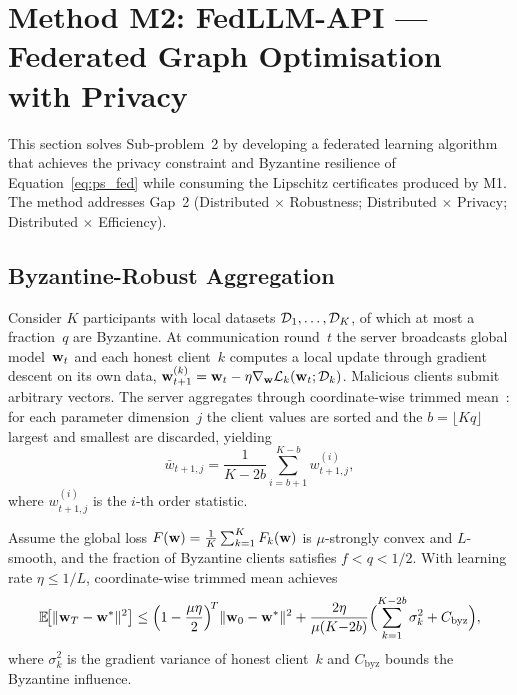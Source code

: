 \section{Method M2: FedLLM-API --- Federated Graph Optimisation with Privacy}
\label{sec:fedllm}

This section solves Sub-problem~2 by developing a federated learning algorithm that achieves the privacy constraint and Byzantine resilience of Equation~\eqref{eq:ps_fed} while consuming the Lipschitz certificates produced by M1. The method addresses Gap~2 (Distributed $\times$ Robustness; Distributed $\times$ Privacy; Distributed $\times$ Efficiency).

\subsection{Byzantine-Robust Aggregation}

Consider $K$ participants with local datasets $\mathcal{D}_1,\dots,\mathcal{D}_K$, of which at most a fraction~$q$ are Byzantine. At communication round~$t$ the server broadcasts global model~$\mathbf{w}_t$ and each honest client~$k$ computes a local update through gradient descent on its own data, $\mathbf{w}_{t+1}^{(k)}=\mathbf{w}_t - \eta\nabla_{\mathbf{w}}\mathcal{L}_k(\mathbf{w}_t;\mathcal{D}_k)$. Malicious clients submit arbitrary vectors. The server aggregates through coordinate-wise trimmed mean~\cite{Yin2018,Blanchard2017,Li2020fedprox}: for each parameter dimension~$j$ the client values are sorted and the $b=\lfloor Kq\rfloor$ largest and smallest are discarded, yielding
\begin{equation}
\bar{w}_{t+1,j}
= \frac{1}{K-2b}\sum_{i=b+1}^{K-b}w_{t+1,j}^{(i)},
\label{eq:fed_trim}
\end{equation}
where $w_{t+1,j}^{(i)}$ is the $i$-th order statistic.

\begin{theorem}
\label{thm:fed_conv}
Assume the global loss $F(\mathbf{w})=\frac{1}{K}\sum_{k=1}^K F_k(\mathbf{w})$ is $\mu$-strongly convex and $L$-smooth, and the fraction of Byzantine clients satisfies $f<q<1/2$. With learning rate $\eta\le 1/L$, coordinate-wise trimmed mean achieves
\begin{equation}
\mathbb{E}\!\bigl[\|\mathbf{w}_T-\mathbf{w}^*\|^2\bigr]
\le \Bigl(1-\frac{\mu\eta}{2}\Bigr)^{\!T}\|\mathbf{w}_0-\mathbf{w}^*\|^2
  + \frac{2\eta}{\mu(K{-}2b)}
    \Bigl(\sum_{k=1}^{K-2b}\sigma_k^2 + C_{\mathrm{byz}}\Bigr),
\label{eq:fed_conv_bound}
\end{equation}
where $\sigma_k^2$ is the gradient variance of honest client~$k$ and $C_{\mathrm{byz}}$ bounds the Byzantine influence.
\end{theorem}

